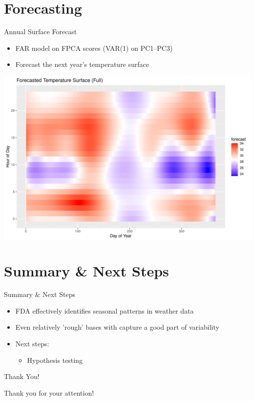 \documentclass[svgnames, 12pt]{beamer}
\begin{document}
\section{Forecasting}
\begin{frame}{Annual Surface Forecast}
	\begin{itemize}
		\item FAR model on FPCA scores (VAR(1) on PC1--PC3)
		\item Forecast the next year's temperature surface
	\end{itemize}
	\begin{center}
		\includegraphics[width=0.7\linewidth]{../notebooks/assets/forecast_surface_full.png}
	\end{center}
\end{frame}

\section{Summary \& Next Steps}

\begin{frame}{Summary \& Next Steps}
	\begin{itemize}
		\item FDA effectively identifies seasonal patterns in weather data
		\item Even relatively 'rough' bases with capture a good part of variability
		\item Next steps:
		\begin{itemize}
			\item Hypothesis testing
		\end{itemize}
	\end{itemize}
\end{frame}

\begin{frame}{Thank You!}
	\begin{center}
		\Huge Thank you for your attention!
	\end{center}
\end{frame}
\end{document}
